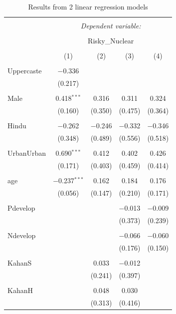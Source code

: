 \documentclass[
]{article}
\begin{document}
\begin{table}[!htbp] \centering 
  \caption{Results from 2 linear regression models} 
  \label{} 
\begin{tabular}{@{\extracolsep{5pt}}lcccc} 
\\[-1.8ex]\hline 
\hline \\[-1.8ex] 
 & \multicolumn{4}{c}{\textit{Dependent variable:}} \\ 
\cline{2-5} 
\\[-1.8ex] & \multicolumn{4}{c}{Risky\_Nuclear} \\ 
\\[-1.8ex] & (1) & (2) & (3) & (4)\\ 
\hline \\[-1.8ex] 
 Uppercaste & $-$0.336 &  &  &  \\ 
  & (0.217) &  &  &  \\ 
  & & & & \\ 
 Male & 0.418$^{***}$ & 0.316 & 0.311 & 0.324 \\ 
  & (0.160) & (0.350) & (0.475) & (0.364) \\ 
  & & & & \\ 
 Hindu & $-$0.262 & $-$0.246 & $-$0.332 & $-$0.346 \\ 
  & (0.348) & (0.489) & (0.556) & (0.518) \\ 
  & & & & \\ 
 UrbanUrban & 0.690$^{***}$ & 0.412 & 0.402 & 0.426 \\ 
  & (0.171) & (0.403) & (0.459) & (0.414) \\ 
  & & & & \\ 
 age & $-$0.237$^{***}$ & 0.162 & 0.184 & 0.176 \\ 
  & (0.056) & (0.147) & (0.210) & (0.171) \\ 
  & & & & \\ 
 Pdevelop &  &  & $-$0.013 & $-$0.009 \\ 
  &  &  & (0.373) & (0.239) \\ 
  & & & & \\ 
 Ndevelop &  &  & $-$0.066 & $-$0.060 \\ 
  &  &  & (0.176) & (0.150) \\ 
  & & & & \\ 
 KahanS &  & 0.033 & $-$0.012 &  \\ 
  &  & (0.241) & (0.397) &  \\ 
  & & & & \\ 
 KahanH &  & 0.048 & 0.030 &  \\ 
  &  & (0.313) & (0.416) &  \\ 

\end{tabular}
\end{table}
\end{document}
